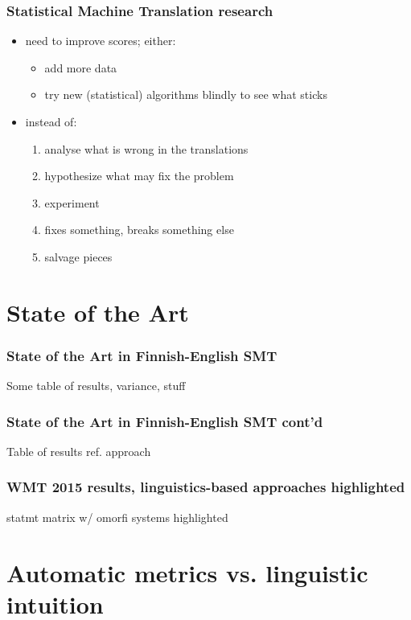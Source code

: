 \documentclass{beamer}
\begin{document}
\begin{frame}
    \frametitle{Statistical Machine Translation research}
    \begin{itemize}
        \item need to improve scores; either:
            \begin{itemize}
                \item add more data
                \item try new (statistical) algorithms blindly to see what sticks
            \end{itemize}
        \item instead of:
            \begin{enumerate}
                \item analyse what is wrong in the translations
                \item hypothesize what may fix the problem
                \item experiment
                \item fixes something, breaks something else
                \item salvage pieces
            \end{enumerate}
    \end{itemize}
\end{frame}

\section{State of the Art}

\begin{frame}
    \frametitle{State of the Art in Finnish-English SMT}
    Some table of results, variance, stuff
\end{frame}

\begin{frame}
    \frametitle{State of the Art in Finnish-English SMT cont'd}
    Table of results ref. approach
\end{frame}

\begin{frame}
    \frametitle{WMT 2015 results, linguistics-based approaches highlighted}
    statmt matrix w/ omorfi systems highlighted
\end{frame}

\section{Automatic metrics vs. linguistic intuition}
\end{document}
